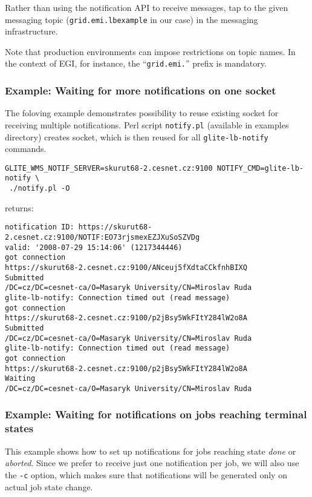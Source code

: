 Rather than using the \LB notification API to receive messages, tap to the given messaging topic (\texttt{grid.emi.lbexample} in our case) in the messaging infrastructure.

Note that production environments can impose restrictions on topic names. In the context of EGI, for instance, the ``\texttt{grid.emi.}'' prefix is mandatory.

\subsubsection{Example: Waiting for more notifications on one socket}

The foloving example demonstrates possibility to reuse existing socket for receiving
multiple notifications. Perl script \verb'notify.pl' (available in 
examples directory) creates socket, which is then reused for all
\verb'glite-lb-notify' commands.

\begin{verbatim}
GLITE_WMS_NOTIF_SERVER=skurut68-2.cesnet.cz:9100 NOTIFY_CMD=glite-lb-notify \
 ./notify.pl -O
\end{verbatim}

returns:

\begin{verbatim}
notification ID: https://skurut68-2.cesnet.cz:9100/NOTIF:EO73rjsmexEZJXuSoSZVDg
valid: '2008-07-29 15:14:06' (1217344446)
got connection
https://skurut68-2.cesnet.cz:9100/ANceuj5fXdtaCCkfnhBIXQ        Submitted
/DC=cz/DC=cesnet-ca/O=Masaryk University/CN=Miroslav Ruda
glite-lb-notify: Connection timed out (read message)
got connection
https://skurut68-2.cesnet.cz:9100/p2jBsy5WkFItY284lW2o8A        Submitted
/DC=cz/DC=cesnet-ca/O=Masaryk University/CN=Miroslav Ruda
glite-lb-notify: Connection timed out (read message)
got connection
https://skurut68-2.cesnet.cz:9100/p2jBsy5WkFItY284lW2o8A        Waiting
/DC=cz/DC=cesnet-ca/O=Masaryk University/CN=Miroslav Ruda
\end{verbatim}


\subsubsection{Example: Waiting for notifications on jobs reaching terminal states}

This example shows how to set up notifications for jobs reaching state \emph{done} or \emph {aborted}. Since we prefer to receive just one notification per job, we will also use the \texttt{-c} option, which makes sure that notifications will be generated only on actual job state change.


